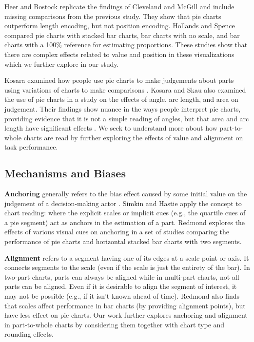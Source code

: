 \documentclass[preprint]{vgtc}               %
\begin{document}
Heer and Bostock \cite{heer2010CrowdsourcingGraphicalPerception} replicate the findings of Cleveland and McGill and include missing comparisons from the previous study. 
They show that pie charts outperform length encoding, but not position encoding.
Hollands and Spence \cite{hollands1998JudgingProportionGraphs} compared pie charts with stacked bar charts, bar charts with no scale, and bar charts with a 100\% reference for estimating proportions. 
These studies show that there are complex effects related to value and position in these visualizations which we further explore in our study. 

Kosara examined how people use pie charts to make judgements about parts using variations of charts to make comparisons \cite{kosara2016JudgmentErrorPie, kosara2019CircularParttoWholeCharts}. 
Kosara and Skau \cite{kosara2019EvidenceAreaPrimary} also examined the use of pie charts in a study on the effects of angle, arc length, and area on judgement.
Their findings show nuance in the ways people interpret pie charts, providing evidence that it is not a simple reading of angles, but that area and arc length have significant effects \cite{skau2016ArcsAnglesAreas}. 
We seek to understand more about how part-to-whole charts are read by further exploring the effects of value and alignment on task performance. 


\subsection{Mechanisms and Biases}
\label{sec:mechanisms-biases}

\indent\textbf{Anchoring}
generally refers to the bias effect caused by some initial value on the judgement of a decision-making actor \cite{tversky1974JudgmentUncertaintyHeuristics, cho2017AnchoringEffectDecisionMaking, furnham2011LiteratureReviewAnchoring, valdez2018PrimingAnchoringEffects}. 
Simkin and Hastie \cite{simkin1987InformationProcessingAnalysisGraph} apply the concept to chart reading: where the explicit scales or implicit cues (e.g., the quartile cues of a pie segment) act as anchors in the estimation of a part. 
Redmond \cite{redmond2019VisualCuesEstimation} explores the effects of various visual cues on anchoring in a set of studies comparing the performance of pie charts and horizontal stacked bar charts with two segments. 

\textbf{Alignment} refers to a segment having one of its edges at a scale point or axis. 
It connects segments to the scale (even if the scale is just the entirety of the bar). 
In two-part charts, parts can always be aligned while in multi-part charts, not all parts can be aligned. 
Even if it is desirable to align the segment of interest, it may not be possible (e.g., if it isn't known ahead of time). 
Redmond \cite{redmond2019VisualCuesEstimation} also finds that scales affect performance in bar charts (by providing alignment points), but have less effect on pie charts. 
Our work further explores anchoring and alignment in part-to-whole charts by considering them together with chart type and rounding effects.
\end{document}

